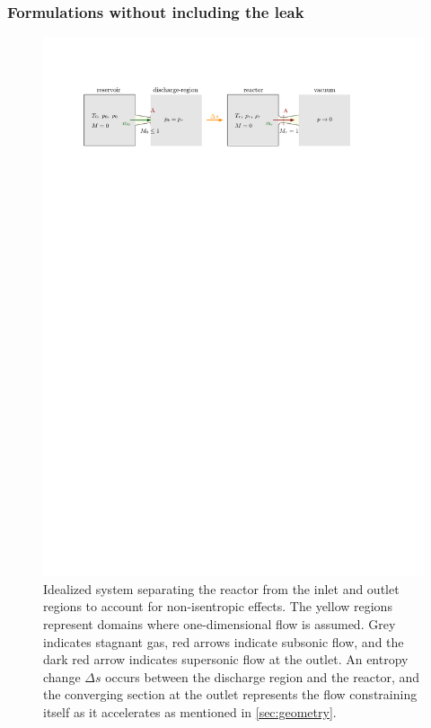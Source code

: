 \subsubsection*{Formulations without including the leak}
	\begin{figure}[H]
	    \centering
	    \includegraphics[width=\textwidth]{src/03_analytical-work/fig_disconnected-reservoirs.pdf}
	    \caption{Idealized system separating the reactor from the inlet and outlet regions to account for non-isentropic effects. The yellow regions represent domains where one-dimensional flow is assumed. Grey indicates stagnant gas, red arrows indicate subsonic flow, and the dark red arrow indicates supersonic flow at the outlet. An entropy change $\Delta s$ occurs between the discharge region and the reactor, and the converging section at the outlet represents the flow constraining itself as it accelerates as mentioned in \ref{sec:geometry}.}
	    \label{fig:disconnected-reservoirs}
	\end{figure}


